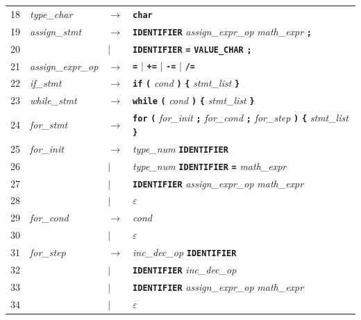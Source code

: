 \documentclass[letterpaper,12pt,oneside]{article}
\begin{document}
\begin{longtable}{c p{2.8cm} p{0.5cm} p{9cm}}
18 & \textit{type\_char} & $\rightarrow$ & \textbf{\texttt{char}} \\[4pt]
19 & \textit{assign\_stmt} & $\rightarrow$ & \textbf{\texttt{IDENTIFIER}} \; \textit{assign\_expr\_op} \; \textit{math\_expr} \; \textbf{\texttt{;}} \\
20 & & $|$ & \textbf{\texttt{IDENTIFIER}} \; \textbf{\texttt{=}} \; \textbf{\texttt{VALUE\_CHAR}} \; \textbf{\texttt{;}} \\[4pt]
21 & \textit{assign\_expr\_op} & $\rightarrow$ & \textbf{\texttt{=}} \; $|$ \; \textbf{\texttt{+=}} \; $|$ \; \textbf{\texttt{-=}} \; $|$ \; \textbf{\texttt{/=}} \\[4pt]
22 & \textit{if\_stmt} & $\rightarrow$ & \textbf{\texttt{if}} \; \textbf{\texttt{(}} \; \textit{cond} \; \textbf{\texttt{)}} \; \textbf{\texttt{\{}} \; \textit{stmt\_list} \; \textbf{\texttt{\}}} \\[4pt]
23 & \textit{while\_stmt} & $\rightarrow$ & \textbf{\texttt{while}} \; \textbf{\texttt{(}} \; \textit{cond} \; \textbf{\texttt{)}} \; \textbf{\texttt{\{}} \; \textit{stmt\_list} \; \textbf{\texttt{\}}} \\[4pt]
24 & \textit{for\_stmt} & $\rightarrow$ & \textbf{\texttt{for}} \; \textbf{\texttt{(}} \; \textit{for\_init} \; \textbf{\texttt{;}} \; \textit{for\_cond} \; \textbf{\texttt{;}} \; \textit{for\_step} \; \textbf{\texttt{)}} \; \textbf{\texttt{\{}} \; \textit{stmt\_list} \; \textbf{\texttt{\}}} \\[4pt]
25 & \textit{for\_init} & $\rightarrow$ & \textit{type\_num} \; \textbf{\texttt{IDENTIFIER}} \\
26 & & $|$ & \textit{type\_num} \; \textbf{\texttt{IDENTIFIER}} \; \textbf{\texttt{=}} \; \textit{math\_expr} \\
27 & & $|$ & \textbf{\texttt{IDENTIFIER}} \; \textit{assign\_expr\_op} \; \textit{math\_expr} \\
28 & & $|$ & $\varepsilon$ \\[4pt]
29 & \textit{for\_cond} & $\rightarrow$ & \textit{cond} \\
30 & & $|$ & $\varepsilon$ \\[4pt]
31 & \textit{for\_step} & $\rightarrow$ & \textit{inc\_dec\_op} \; \textbf{\texttt{IDENTIFIER}} \\
32 & & $|$ & \textbf{\texttt{IDENTIFIER}} \; \textit{inc\_dec\_op} \\
33 & & $|$ & \textbf{\texttt{IDENTIFIER}} \; \textit{assign\_expr\_op} \; \textit{math\_expr} \\
34 & & $|$ & $\varepsilon$ \\[4pt]

\end{longtable}
\end{document}

